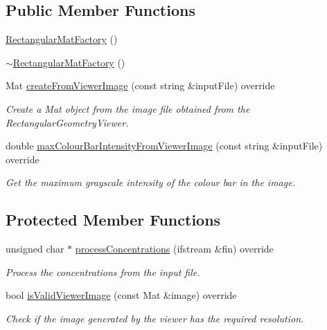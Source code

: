 \subsection*{Public Member Functions}
\begin{DoxyCompactItemize}
\item 
\hyperlink{classmultiscale_1_1analysis_1_1RectangularMatFactory_a20b4c70b7964fb40c4767ab2d7e1ae92}{Rectangular\-Mat\-Factory} ()
\item 
\hyperlink{classmultiscale_1_1analysis_1_1RectangularMatFactory_a3ebedd3691965c3d89c3ecdaa3e66d70}{$\sim$\-Rectangular\-Mat\-Factory} ()
\item 
Mat \hyperlink{classmultiscale_1_1analysis_1_1RectangularMatFactory_a3f86c9bd73eb8d8a27f272b47e984871}{create\-From\-Viewer\-Image} (const string \&input\-File) override
\begin{DoxyCompactList}\small\item\em Create a Mat object from the image file obtained from the Rectangular\-Geometry\-Viewer. \end{DoxyCompactList}\item 
double \hyperlink{classmultiscale_1_1analysis_1_1RectangularMatFactory_a9255b11748b4c48d76c769258d6b6ee0}{max\-Colour\-Bar\-Intensity\-From\-Viewer\-Image} (const string \&input\-File) override
\begin{DoxyCompactList}\small\item\em Get the maximum grayscale intensity of the colour bar in the image. \end{DoxyCompactList}\end{DoxyCompactItemize}
\subsection*{Protected Member Functions}
\begin{DoxyCompactItemize}
\item 
unsigned char $\ast$ \hyperlink{classmultiscale_1_1analysis_1_1RectangularMatFactory_a6cc84a4eadbab5046cb6eacba64f5ae4}{process\-Concentrations} (ifstream \&fin) override
\begin{DoxyCompactList}\small\item\em Process the concentrations from the input file. \end{DoxyCompactList}\item 
bool \hyperlink{classmultiscale_1_1analysis_1_1RectangularMatFactory_a398913bbfa8ca9d80cb630c29a37a135}{is\-Valid\-Viewer\-Image} (const Mat \&image) override
\begin{DoxyCompactList}\small\item\em Check if the image generated by the viewer has the required resolution. \end{DoxyCompactList}\end{DoxyCompactItemize}
